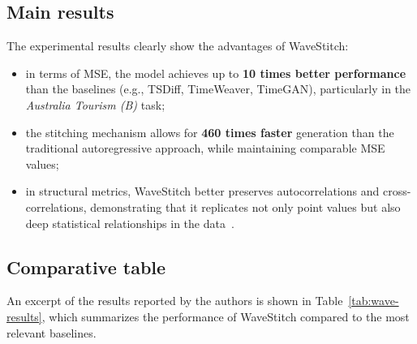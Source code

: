 \subsection{Main results}
The experimental results clearly show the advantages of WaveStitch:  
\begin{itemize}
    \item in terms of MSE, the model achieves up to \textbf{10 times better performance} than the baselines (e.g., TSDiff, TimeWeaver, TimeGAN), particularly in the \emph{Australia Tourism (B)} task;  

    \item the stitching mechanism allows for \textbf{460 times faster} generation than the traditional autoregressive approach, while maintaining comparable MSE values;  

    \item in structural metrics, WaveStitch better preserves autocorrelations and cross-correlations, demonstrating that it replicates not only point values but also deep statistical relationships in the data~\cite{wavestitch,tashiro2021csdi,zhou2023timeweaver,yoon2019timegan}.  
\end{itemize}

\subsection{Comparative table}
An excerpt of the results reported by the authors is shown in Table~\ref{tab:wave-results}, which summarizes the performance of WaveStitch compared to the most relevant baselines.  

